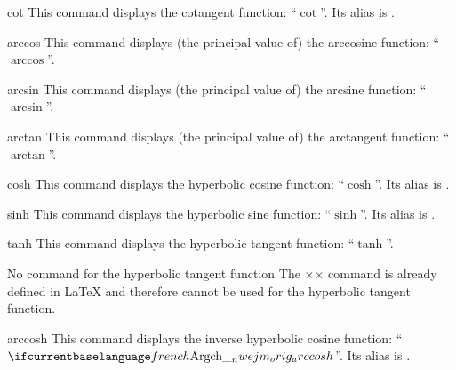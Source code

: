 \documentclass[english,nolocaltoc]{nwejmart}
\newtheorem[style=definition]{fact}
\newtheorem[title=experience]{experience}
\newtheorem[title-plural=rings]{ring}
\newtheorem[title=ideal,title-plural=ideals]{ideal}
\begin{document}
\begin{docCommand}{cot}{}
  This command displays  the cotangent function: \enquote{$\cot$}. Its
  alias is .
\end{docCommand}

\begin{docCommand}{arccos}{}
  This command displays  (the principal value of)  the arccosine function:
  \enquote{$\arccos$}.
\end{docCommand}

\begin{docCommand}{arcsin}{}
  This command displays  (the principal value of)  the arcsine function:
  \enquote{$\arcsin$}.
\end{docCommand}

\begin{docCommand}{arctan}{}
  This command displays  (the principal value of)  the arctangent function:
  \enquote{$\arctan$}.
\end{docCommand}

\begin{docCommand}{cosh}{}
   This command displays  the hyperbolic cosine function:
   \enquote{$\cosh$}. Its alias is .
\end{docCommand}

\begin{docCommand}{sinh}{}
  This command displays  the hyperbolic sine function:
  \enquote{$\sinh$}. Its alias is .
\end{docCommand}

\begin{docCommand}{tanh}{}
  This command displays the hyperbolic tangent function:
  \enquote{$\tanh$}.
  \begin{dbremark}{No \protect{} command  for the hyperbolic tangent function}{}
    The ×\th× command  is already defined in \LaTeX{} and therefore
    cannot be used for the hyperbolic tangent function.
  \end{dbremark}
\end{docCommand}

\begin{docCommand}{arccosh}{}
  This command displays  the inverse hyperbolic cosine function:
  \enquote{$\arccosh$}.
  Its alias is .
\end{docCommand}
\end{document}
